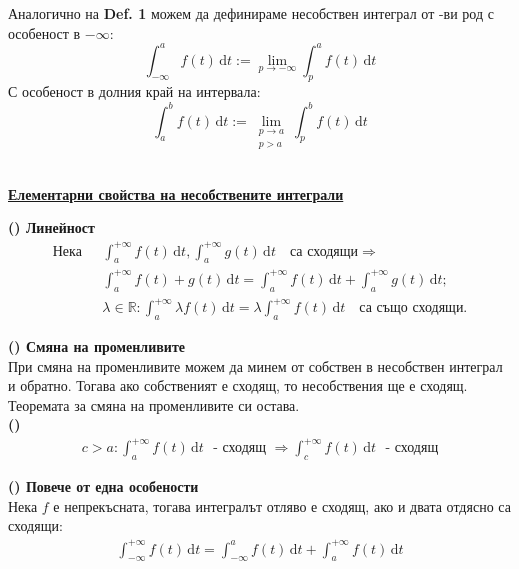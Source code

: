 \documentclass[12pt]{article}
\newcommand{\RNum}[1]{\uppercase\expandafter{\romannumeral #1\relax}}
\newcommand{\spc}{\text{ }}
\begin{document}
	Аналогично на \textbf{Def. 1} можем да дефинираме несобствен интеграл от \RNum{1}-ви род с особеност в $-\infty$:
	\[\int_{-\infty}^{a}f(t)\,\mathrm{d}t := \lim_{p\to -\infty}\int_{p}^{a}f(t)\,\mathrm{d}t\] 
	С особеност в долния край на интервала:
	\[\int_{a}^{b}f(t)\,\mathrm{d}t := \lim_{\substack{p\to a \\ p>a}}\int_{p}^{b}f(t)\,\mathrm{d}t\]\\
	
	\begin{center}
		\textbf{\large\underline{Елементарни свойства на несобствените интеграли}}
	\end{center}
	
	\textbf{(\RNum{1}) Линейност}\\
	\[
	\begin{aligned}
		\text{Нека}\spc &\int_{a}^{+\infty}f(t)\,\mathrm{d}t, \int_{a}^{+\infty}g(t)\,\mathrm{d}t \spc\text{ са сходящи} \Rightarrow \\
		&\int_{a}^{+\infty}f(t) + g(t)\,\mathrm{d}t = \int_{a}^{+\infty}f(t)\,\mathrm{d}t + \int_{a}^{+\infty}g(t)\,\mathrm{d}t\text{;}\\
		&\lambda\in\mathbb{R}:
		\int_{a}^{+\infty}\lambda f(t)\,\mathrm{d}t = \lambda\int_{a}^{+\infty}f(t)\,\mathrm{d}t\spc\text{ са също сходящи.}
	\end{aligned}
	\]
	
	\textbf{(\RNum{2}) Смяна на променливите}\\
	При смяна на променливите можем да минем от собствен в несобствен интеграл и обратно. Тогава ако собственият е сходящ, то несобствения ще е сходящ. Теоремата за смяна на променливите си остава.\\
	
	\textbf{(\RNum3)}\\
	\[
	\begin{aligned}
		c>a: \int_{a}^{+\infty}f(t)\,\mathrm{d}t \spc\text{- сходящ }\Rightarrow\int_{c}^{+\infty}f(t)\,\mathrm{d}t \spc\text{- сходящ}
	\end{aligned}
	\]
	
	\textbf{(\RNum4) Повече от една особености}\\
	Нека $f$ е непрекъсната, тогава интегралът отляво е сходящ, ако и двата отдясно са сходящи:
	\[
	\begin{aligned}
		\int_{-\infty}^{+\infty}f(t)\,\mathrm{d}t = \int_{-\infty}^{a}f(t)\,\mathrm{d}t + \int_{a}^{+\infty}f(t)\,\mathrm{d}t
	\end{aligned}
	\]
	\\
	
\end{document}
